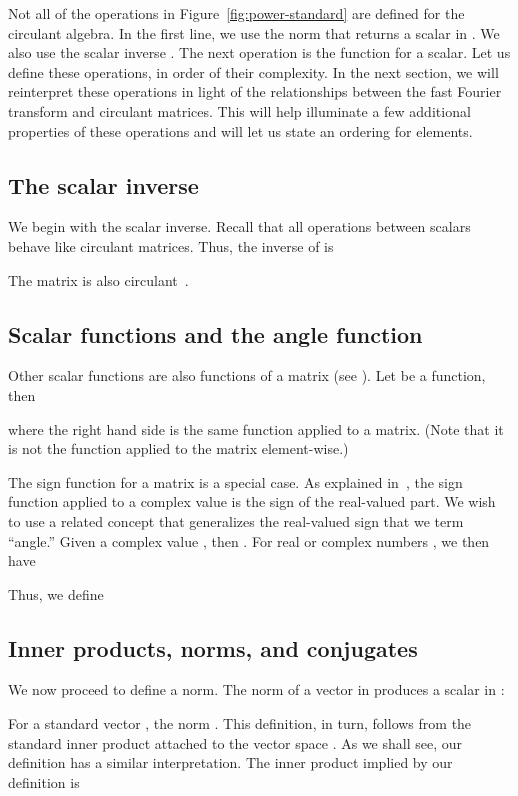 \documentclass[1p,authoryear,letterpaper]{elsarticle}
\renewcommand{\cite}{\citep}
\begin{document}
Not all of the operations in Figure~\ref{fig:power-standard} are defined for the
circulant algebra.  In the
first line, we use the norm  that returns
a scalar in .  We also use the scalar inverse .
The next operation is the  function for a scalar.
Let us define these operations, in order of
their complexity.  In the next section, we will reinterpret
these operations in light of the relationships between
the fast Fourier transform and circulant matrices.
This will help illuminate a few additional properties
of these operations and will let us state an ordering for elements.

\subsection{The scalar inverse}
We begin with the scalar inverse.  Recall that
all operations between scalars behave like circulant
matrices.  Thus, the inverse of  is

The matrix  is also
circulant~\cite{davis1979-circulant}.

\subsection{Scalar functions and the angle function}
Other scalar functions are also functions of a
matrix (see
\citet{Higham2008-functions-of-matrices}).
Let 
be a function, then

where the right hand side is the same function
applied to a matrix.  (Note that it is not the function applied
to the matrix element-wise.)  



The sign function for a matrix is a special case.
As explained in~\citet{Higham2008-functions-of-matrices},
the sign function applied to a complex value is
the sign of the real-valued part.  We wish to use
a related concept that generalizes the real-valued
sign that we term ``angle.''  Given a complex value
, then
.
For real or complex numbers , we then have

Thus, we define




\subsection{Inner products, norms, and conjugates}
\label{sec:norm}

We now proceed  to define a norm.  The norm of
a vector in  produces a scalar in :

For a standard vector , the norm
.  This definition, in turn,
follows from the standard inner product attached
to the vector space .  As we shall see, our definition
has a similar interpretation.  The inner product implied by our
definition is
\end{document}
